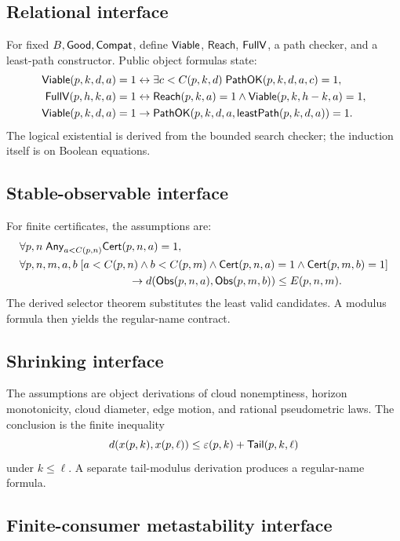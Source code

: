 \subsection{Relational interface}

For fixed \(B,\mathsf{Good},\mathsf{Compat}\), define \(\mathsf{Viable}\), \(\mathsf{Reach}\),
\(\mathsf{FullV}\), a path checker, and a least-path constructor.  Public object
formulas state:
\begin{align*}
\mathsf{Viable}(p,k,d,a)=1&\leftrightarrow
  \exists c<C(p,k,d)\;\mathsf{PathOK}(p,k,d,a,c)=1,\\
\mathsf{FullV}(p,h,k,a)=1&\leftrightarrow
  \mathsf{Reach}(p,k,a)=1\wedge\mathsf{Viable}(p,k,h-k,a)=1,\\
\mathsf{Viable}(p,k,d,a)=1&\to
  \mathsf{PathOK}(p,k,d,a,\mathsf{leastPath}(p,k,d,a))=1.
\end{align*}
The logical existential is derived from the bounded search checker; the
induction itself is on Boolean equations.

\subsection{Stable-observable interface}

For finite certificates, the assumptions are:
\begin{align*}
&\forall p,n\;\Any_{a<C(p,n)}\mathsf{Cert}(p,n,a)=1,\\
&\forall p,n,m,a,b\;[a<C(p,n)\wedge b<C(p,m)\wedge
 \mathsf{Cert}(p,n,a)=1\wedge\mathsf{Cert}(p,m,b)=1]\\
&\hspace{35mm}\to
 d(\Obs(p,n,a),\Obs(p,m,b))\le E(p,n,m).
\end{align*}
The derived selector theorem substitutes the least valid candidates.  A modulus
formula then yields the regular-name contract.

\subsection{Shrinking interface}

The assumptions are object derivations of cloud nonemptiness, horizon
monotonicity, cloud diameter, edge motion, and rational pseudometric laws.  The
conclusion is the finite inequality
\[
 d(x(p,k),x(p,\ell))\le
 \varepsilon(p,k)+\mathsf{Tail}(p,k,\ell)
\]
under \(k\le\ell\).  A separate tail-modulus derivation produces a regular-name
formula.

\subsection{Finite-consumer metastability interface}

